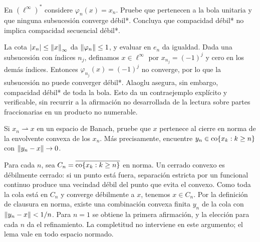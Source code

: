 \begin{ejercicio}\label{ej:v3-l17-1}
En $(\ell^\infty)^*$ considere $\varphi_n(x)=x_n$. Pruebe que pertenecen a la bola unitaria y que ninguna subsucesión converge débil*. Concluya que compacidad débil* no implica compacidad secuencial débil*.
\end{ejercicio}
\begin{solucion}
La cota $|x_n|\leq\left\lVert x\right\rVert_\infty$ da $\left\lVert\varphi_n\right\rVert\leq1$, y evaluar en $e_n$ da igualdad. Dada una subsucesión con índices $n_j$, definamos $x\in\ell^\infty$ por $x_{n_j}=(-1)^j$ y cero en los demás índices. Entonces $\varphi_{n_j}(x)=(-1)^j$ no converge, por lo que la subsucesión no puede converger débil*. Alaoglu asegura, sin embargo, compacidad débil* de toda la bola. Esto da un contraejemplo explícito y verificable, sin recurrir a la afirmación no desarrollada de la lectura sobre partes fraccionarias en un producto no numerable.
\end{solucion}

\begin{ejercicio}\label{ej:v3-l17-2}\label{v3:mazur}
Si $x_n\rightharpoonup x$ en un espacio de Banach, pruebe que $x$ pertenece al cierre en norma de la envolvente convexa de los $x_n$. Más precisamente, encuentre $y_n\in\operatorname{co}\{x_k:k\geq n\}$ con $\left\lVert y_n-x\right\rVert\to0$.
\end{ejercicio}
\begin{solucion}
Para cada $n$, sea $C_n=\overline{\operatorname{co}\{x_k:k\geq n\}}$ en norma. Un cerrado convexo es débilmente cerrado: si un punto está fuera, separación estricta por un funcional continuo produce una vecindad débil del punto que evita el convexo. Como toda la cola está en $C_n$ y converge débilmente a $x$, tenemos $x\in C_n$. Por la definición de clausura en norma, existe una combinación convexa finita $y_n$ de la cola con $\left\lVert y_n-x\right\rVert<1/n$. Para $n=1$ se obtiene la primera afirmación, y la elección para cada $n$ da el refinamiento. La completitud no interviene en este argumento; el lema vale en todo espacio normado.
\end{solucion}

